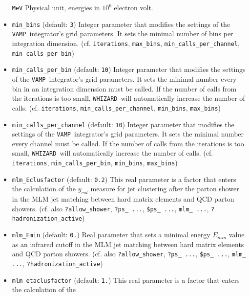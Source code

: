 \documentclass[12pt]{book}
\newcommand{\ttt}[1]{\texttt{#1}}
\newcommand{\whizard}{\texttt{WHIZARD}}
\newcommand{\vamp}{\texttt{VAMP}}
\begin{document}
\begin{itemize}
\ttt{MeV} \newline
Physical unit, energies in $10^6$ electron volt.
\item
\ttt{min\_bins} \qquad (default: \ttt{3}) \newline
Integer parameter that modifies the settings of the \vamp\
integrator's grid parameters. It sets the minimal number of bins per
integration dimension. (cf. \ttt{iterations}, \ttt{max\_bins},
\ttt{min\_calls\_per\_channel}, \ttt{min\_calls\_per\_bin})  
\item
\ttt{min\_calls\_per\_bin} \qquad (default: \ttt{10}) \newline
Integer parameter that modifies the settings of the \vamp\
integrator's grid parameters. It sets the minimal number every bin in
an integration dimension must be called. If the number of calls
from the iterations is too small, \whizard\ will automatically
increase the number of calls. (cf. \ttt{iterations},
\ttt{min\_calls\_per\_channel}, \ttt{min\_bins}, \ttt{max\_bins})
\item
\ttt{min\_calls\_per\_channel} \qquad (default: \ttt{10}) \newline
Integer parameter that modifies the settings of the \vamp\
integrator's grid parameters. It sets the minimal number every channel
must be called. If the number of calls from the iterations is too
small, \whizard\ will automatically increase the number of
calls. (cf. \ttt{iterations}, \ttt{min\_calls\_per\_bin},
\ttt{min\_bins}, \ttt{max\_bins})
\item
\ttt{mlm\_Eclusfactor} \qquad (default: \ttt{0.2}) \newline
This real parameter is a factor that enters the calculation of the
$y_{cut}$ measure for jet clustering after the parton shower in the
MLM jet matching between hard matrix elements and QCD parton showers. 
(cf. also \ttt{?allow\_shower}, \ttt{?ps\_ ...}, \ttt{\$ps\_ ...},
\ttt{mlm\_ ...}, \ttt{?hadronization\_active})  
\item
\ttt{mlm\_Emin} \qquad (default: \ttt{0.}) \newline
Real parameter that sets a minimal energy $E_{min}$ value as an
infrared cutoff in the MLM jet matching between hard matrix elements
and QCD parton showers.  (cf. also \ttt{?allow\_shower}, \ttt{?ps\_
...}, \ttt{\$ps\_ ...}, \ttt{mlm\_ ...}, \ttt{?hadronization\_active}) 
\item
\ttt{mlm\_etaclusfactor} \qquad (default: \ttt{1.}) \newline
This real parameter is a factor that enters the calculation of the

\end{itemize}
\end{document}
